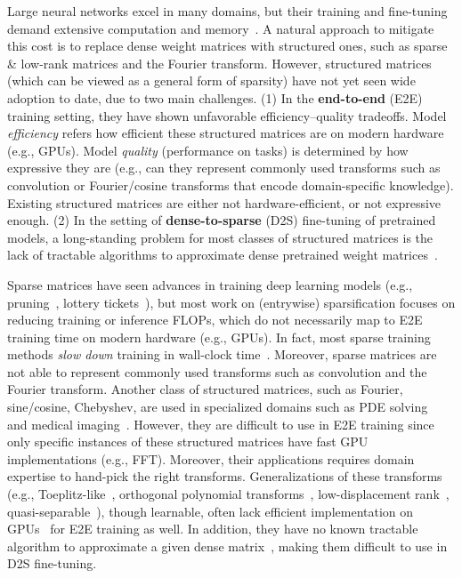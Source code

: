 Large neural networks excel in many domains, but their training and fine-tuning demand extensive computation and memory~\citep{kaplan2020scaling}. A natural approach to mitigate this cost is to replace dense weight matrices with structured ones, such as sparse \& low-rank matrices and the Fourier transform. However, structured matrices (which can be viewed as a general form of sparsity) have not yet seen wide adoption to date, due to two main challenges. (1) In the \textbf{end-to-end} (E2E) training setting, they have shown unfavorable efficiency--quality tradeoffs. Model \emph{efficiency} refers how efficient these structured matrices are on modern hardware (e.g., GPUs). Model \emph{quality} (performance on tasks) is determined by how expressive they are (e.g., can they represent commonly used transforms such as convolution or Fourier/cosine transforms that encode domain-specific knowledge). Existing structured matrices are either not hardware-efficient, or not expressive enough. (2) In the setting of \textbf{dense-to-sparse} (D2S) fine-tuning of pretrained models, a long-standing problem for most classes of structured matrices is the lack of tractable algorithms to approximate dense pretrained weight matrices~\citep{pan2012structured}.

Sparse matrices have seen advances in training deep learning models (e.g., pruning~\citep{han2015deep}, lottery tickets~\citep{frankle2018lottery}), but most work on (entrywise) sparsification focuses on reducing training or inference FLOPs, which do not necessarily map to E2E training time on modern hardware (e.g., GPUs). In fact, most sparse training methods \emph{slow down} training in wall-clock time~\citep{gale2019state, hooker2020hardware}. Moreover, sparse matrices are not able to represent commonly used transforms such as convolution and the Fourier transform. Another class of structured matrices, such as Fourier, sine/cosine, Chebyshev, are used in specialized domains such as PDE solving~\citep{trefethen2000spectral} and medical imaging~\citep{hsieh2003computed}. However, they are difficult to use in E2E training since only specific instances of these structured matrices have fast GPU implementations (e.g., FFT). Moreover, their applications requires domain expertise to hand-pick the right transforms. Generalizations of these transforms (e.g., Toeplitz-like~\citep{sindhwani2015structured}, orthogonal polynomial transforms~\citep{driscoll1997fast}, low-displacement rank~\citep{kailath1979displacement}, quasi-separable~\citep{eidelman1999new}), though learnable, often lack efficient implementation on GPUs~\citep{thomas2018learning} for E2E training as well. In addition, they have no known tractable algorithm to approximate a given dense matrix~\citep{pan2012structured}, making them difficult to use in D2S fine-tuning.

